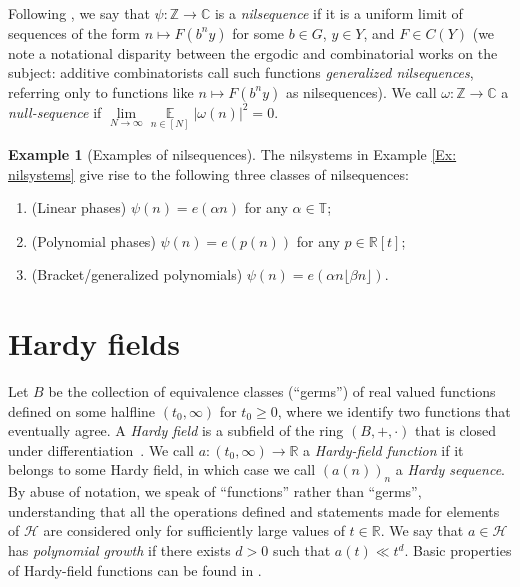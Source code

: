 \documentclass[11pt]{amsart}
\theoremstyle{definition}
\newtheorem{example}[lemma]{Example}
\DeclareMathOperator*{\E}{\mathbb{E}}
\newcommand{\C}{{\mathbb C}}
\newcommand{\R}{{\mathbb R}}
\newcommand{\T}{{\mathbb T}}
\newcommand{\Z}{{\mathbb Z}}
\newcommand{\CH}{{\mathcal H}}
\newcommand{\1}{{\mathbf{1}}}
\newcommand{\sfloor}[1]{{\lfloor #1 \rfloor}}
\begin{document}
Following \cite{BHK05}, we say that $\psi:\Z\to\C$ is a {\em nilsequence} if it is a uniform limit of sequences of the form $n\mapsto F(b^ny)$ for some  $b\in G$, $y\in Y$, and $F\in C(Y)$ (we note a notational disparity between the ergodic and combinatorial works on the subject: additive combinatorists call such functions \emph{generalized nilsequences}, referring only to functions like $n\mapsto F(b^ny)$ as nilsequences). We call $\omega:\Z\to\C$ a \emph{null-sequence} if $\lim\limits_{N\to\infty}\E\limits_{n\in[N]}|\omega(n)|^2 =0$. 
\begin{example}[Examples of nilsequences]\label{Ex: nilsequences}
    The nilsystems in Example \ref{Ex: nilsystems} give rise to the following three classes of nilsequences:
    \begin{enumerate}
        \item (Linear phases) $\psi(n) = e(\alpha n)$ for any $\alpha\in\T$;
        \item (Polynomial phases) $\psi(n) = e(p(n))$ for any $p\in\R[t]$;
        \item (Bracket/generalized polynomials) $\psi(n) = e(\alpha n\sfloor{\beta n})$.
    \end{enumerate}
\end{example}


\section{Hardy fields}\label{A: Hardy}
Let $B$ be the collection of equivalence classes (``germs'') of real valued functions defined on some halfline $(t_0,\infty)$ for $t_0\geq 0$, where we identify two functions that eventually agree.  A \emph{Hardy field} is a subfield of the ring $(B, +, \cdot)$ that is closed under differentiation~\cite{Hardy12}. We call $a\colon (t_0,\infty)\to\R$ a \emph{Hardy-field function} if it belongs to some Hardy field, in which case we call $(a(n))_n$ a \emph{Hardy sequence}.
 By abuse of notation, we speak of ``functions'' rather than ``germs'', understanding that all the operations defined and statements made for elements of $\CH$ are considered only for sufficiently large values of $t\in \mathbb{R}$. 
  We say that $a\in\CH$ has \emph{polynomial growth} if there exists $d>0$ such that $a(t)\ll t^d$.   
 Basic properties of Hardy-field functions can be found in \cite{Boshernitzan-equidistribution, Fr10, Kho}.
\end{document}

